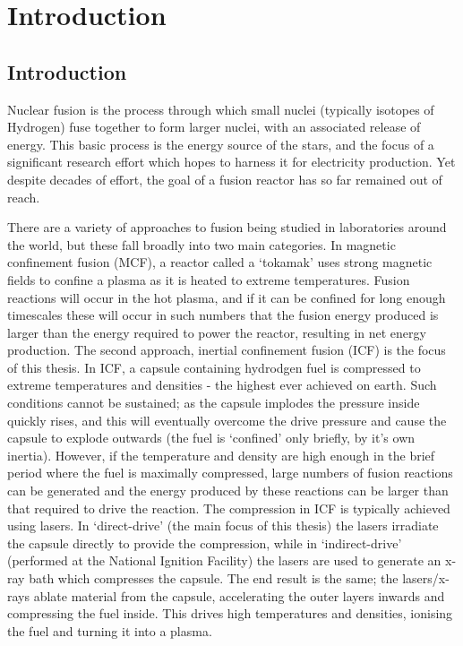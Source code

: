 

\chapter{Introduction} 

\minitoc


\section{Introduction}
Nuclear fusion is the process through which small nuclei (typically isotopes of Hydrogen) fuse together to form larger nuclei, with an associated release of energy. This basic process is the energy source of the stars, and the focus of a significant research effort which hopes to harness it for electricity production. Yet despite decades of effort, the goal of a fusion reactor has so far remained out of reach.

There are a variety of approaches to fusion being studied in laboratories around the world, but these fall broadly into two main categories. In magnetic confinement fusion (MCF), a reactor called a `tokamak' uses strong magnetic fields to confine a plasma as it is heated to extreme temperatures. Fusion reactions will occur in the hot plasma, and if it can be confined for long enough timescales these will occur in such numbers that the fusion energy produced is larger than the energy required to power the reactor, resulting in net energy production. The second approach, inertial confinement fusion (ICF) is the focus of this thesis. In ICF, a capsule containing hydrodgen fuel is compressed to extreme temperatures and densities - the highest ever achieved on earth. Such conditions cannot be sustained; as the capsule implodes the pressure inside quickly rises, and this will eventually overcome the drive pressure and cause the capsule to explode outwards (the fuel is `confined' only briefly, by it's own inertia). However, if the temperature and density are high enough in the brief period where the fuel is maximally compressed, large numbers of fusion reactions can be generated and the energy produced by these reactions can be larger than that required to drive the reaction. The compression in ICF is typically achieved using lasers. In `direct-drive' (the main focus of this thesis) the lasers irradiate the capsule directly to provide the compression, while in `indirect-drive' (performed at the National Ignition Facility) the lasers are used to generate an x-ray bath which compresses the capsule. The end result is the same; the lasers/x-rays ablate material from the capsule, accelerating the outer layers inwards and compressing the fuel inside. This drives high temperatures and densities, ionising the fuel and turning it into a plasma.

